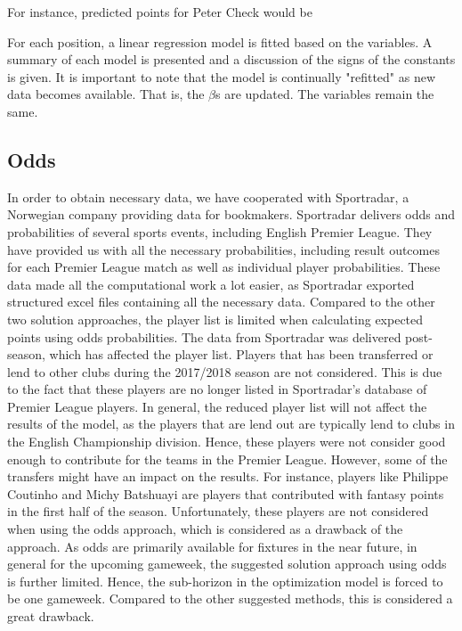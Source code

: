 For instance, predicted points for Peter Check would be \newpar

For each position, a linear regression model is fitted based on the variables. A summary of each model is presented and a discussion of the signs of the constants is given. It is important to note that the model is continually "refitted" as new data becomes available. That is, the $\beta $s are updated. The variables remain the same. \newpar

\subsection{Odds}
In order to obtain necessary data, we have cooperated with Sportradar, a Norwegian company providing data for bookmakers. Sportradar delivers odds and probabilities of several sports events, including English Premier League. They have provided us with all the necessary probabilities, including result outcomes for each Premier League match as well as individual player probabilities. These data made all the computational work a lot easier, as Sportradar exported structured excel files containing all the necessary data. 
\newpar
Compared to the other two solution approaches, the player list is limited when calculating expected points using odds probabilities. The data from Sportradar was delivered post-season, which has affected the player list. Players that has been transferred or lend to other clubs during the 2017/2018 season are not considered. This is due to the fact that these players are no longer listed in Sportradar's database of Premier League players. In general, the reduced player list will not affect the results of the model, as the players that are lend out are typically lend to clubs in the English Championship division. Hence, these players were not consider good enough to contribute for the teams in the Premier League. However, some of the transfers might have an impact on the results. For instance, players like Philippe Coutinho and Michy Batshuayi are players that contributed with fantasy points in the first half of the season. Unfortunately, these players are not considered when using the odds approach, which is considered as a drawback of the approach.  
\newpar
As odds are primarily available for fixtures in the near future, in general for the upcoming gameweek, the suggested solution approach using odds is further limited. Hence, the sub-horizon in the optimization model is forced to be one gameweek. Compared to the other suggested methods, this is considered a great drawback.

